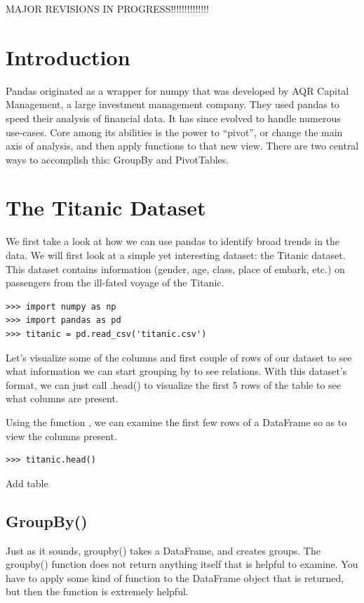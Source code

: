 \label{lab:pandas3}

MAJOR REVISIONS IN PROGRESS!!!!!!!!!!!!!!

\section*{Introduction}
Pandas originated as a wrapper for numpy that was developed by AQR Capital Management, a large investment management company. They used pandas to speed their analysis of financial data. It has since evolved to handle numerous use-cases. Core among its abilities is the power to ``pivot'', or change the main axis of analysis, and then apply functions to that new view. There are two central ways to accomplish this: GroupBy and PivotTables.

\section*{The Titanic Dataset}
We first take a look at how we can use pandas to identify broad trends in the data. We will first look at a simple yet interesting dataset: the Titanic dataset. This dataset contains information (gender, age, class, place of embark, etc.) on passengers from the ill-fated voyage of the Titanic.

\begin{lstlisting}
>>> import numpy as np
>>> import pandas as pd
>>> titanic = pd.read_csv('titanic.csv')
\end{lstlisting}

Let's visualize some of the columns and first couple of rows of our dataset to see what information we can start grouping by to see relations. With this dataset's format, we can just call .head() to visualize the first 5 rows of the table to see what columns are present.

Using the function , we can examine the first few rows of a DataFrame so as to view the columns present.

\begin{lstlisting}
>>> titanic.head()
\end{lstlisting}

Add table

\subsection*{GroupBy()}
Just as it sounds, groupby() takes a DataFrame, and creates groups. The groupby() function does not return anything itself that is helpful to examine. You have to apply some kind of function to the DataFrame object that is returned, but then the function is extremely helpful.

